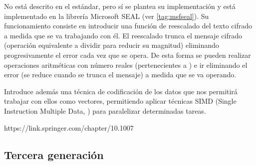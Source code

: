 \begin{itemize}
    No está descrito en el estándar, pero sí se plantea su implementación y está implementado en la librería Microsoft SEAL (ver \ref{tag:msfseal}). Su funcionamiento consiste en introducir una función de reescalado del texto cifrado a medida que se va trabajando con él. El reescalado trunca el mensaje cifrado (operación equivalente a dividir para reducir su magnitud) eliminando progresivamente el error cada vez que se opera. De esta forma se pueden realizar operaciones aritméticas con número reales (pertenecientes a ) e ir eliminando el error (se reduce cuando se trunca el mensaje) a medida que se va operando.

    Introduce además una técnica de codificación de los datos que nos permitirá trabajar con ellos como vectores, permitiendo aplicar técnicas SIMD (Single Instruction Multiple Data, \cite{SIMD}) para paralelizar determinadas tareas.


    https://link.springer.com/chapter/10.1007%

\end{itemize}

\subsection{Tercera generación}

